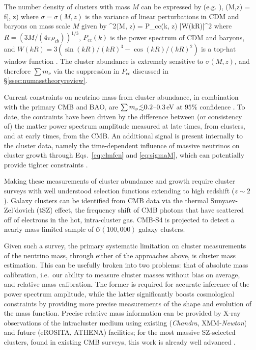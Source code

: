 The number density of clusters with mass $M$ can be expressed by (e.g. \cite{Tinker:2008ff,Bhattacharya:2010wy}), 
\beq
\label{eq:clmfcn}
(M,z) =  f(\sigma, z)
\eeq
where $\sigma = \sigma(M,z)$ is the variance of linear perturbations in CDM and baryons on mass scale $M$ given by
\beq
\label{eq:sigmaM}
\sigma^2(M, z) = \int {}  P_{cc}(k, z) |W(kR)|^2
\eeq
where $R = (3M/(4\pi \rho_{cb}))^{1/3}$, $P_{cc}(k)$ is the power spectrum of CDM and baryons, and $W(kR) = 3(\sin(kR)/(kR)^3 - \cos(kR)/(kR)^2)$ is a top-hat window function \cite{Costanzi:2013bha,LoVerde:2014rxa}. The cluster abundance is extremely sensitive to $\sigma(M, z)$, and therefore $\sum m_\nu$ via the suppression in $P_{cc}$ discussed in \S\ref{ssec:numasstheoryreview}.

Current constraints on neutrino mass from cluster abundance, in combination with the primary CMB and BAO, are $\sum m_\nu \lsim 0.2$--$0.3$\,eV at $95\%$ confidence \cite{Hasselfield:2013wf,Mantz:2014paa,Ade:2015fva,deHaan:2016qvy}. To date, the contraints have been driven by the difference between (or consistency of) the matter power spectrum amplitude measured at late times, from clusters, and at early times, from the CMB. An additional signal is present internally to the cluster data, namely the time-dependent influence of massive neutrinos on cluster growth through Eqs.~\ref{eq:clmfcn} and \ref{eq:sigmaM}, which can potentially provide tighter constraints \cite{Wang:2005vr}.


Making these measurements of cluster abundance and growth require cluster surveys with well understood selection functions extending to high redshift ($z\sim2$). Galaxy clusters can be identified from CMB data via the thermal Sunyaev-Zel'dovich (tSZ) effect, the frequency shift of CMB photons that have scattered off of electrons in the hot, intra-cluster gas.  CMB-S4 is projected to detect a nearly mass-limited sample of $\mathcal{O}(100,000)$ galaxy clusters.

Given such a survey, the primary systematic limitation on cluster measurements of the neutrino mass, through either of the approaches above, is cluster mass estimation. This can be usefully broken into two problems: that of absolute mass calibration, i.e.\ our ability to measure cluster masses without bias on average, and relative mass calibration. The former is required for accurate inference of the power spectrum amplitude, while the latter significantly boosts cosmological constraints by providing more precise measurements of the shape and evolution of the mass function. Precise relative mass information can be provided by X-ray observations of the intracluster medium using existing ({\it Chandra}, XMM-{\it Newton}) and future (eROSITA, ATHENA) facilities; for the most massive SZ-selected clusters, found in existing CMB surveys, this work is already well advanced \cite{deHaan:2016qvy, Andersson:2010vy}. 

